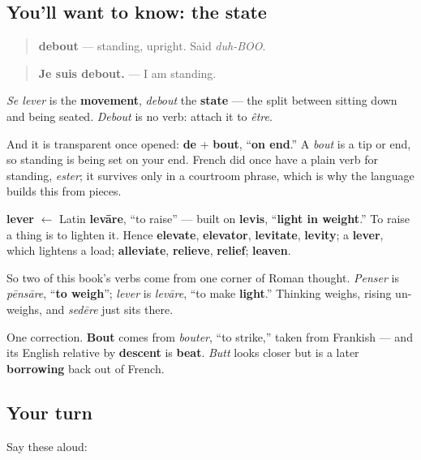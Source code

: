 \subsection*{You'll want to know: the state}
\begin{quote}
\textbf{debout} — standing, upright. Said \emph{duh-BOO}.
\end{quote}

\begin{quote}
\textbf{Je suis debout.} — I am standing.
\end{quote}

\emph{Se lever} is the \textbf{movement}, \emph{debout} the \textbf{state} — the split between sitting down and being seated. \emph{Debout} is no verb: attach it to \emph{être}.

And it is transparent once opened: \textbf{de} + \textbf{bout}, \textquotedblleft{}\textbf{on end}.\textquotedblright{} A \emph{bout} is a tip or end, so standing is being set on your end. French did once have a plain verb for standing, \emph{ester}; it survives only in a courtroom phrase, which is why the language builds this from pieces.

\begin{cousinweb}
\textbf{lever} $\leftarrow$ Latin \textbf{levāre}, \textquotedblleft{}to raise\textquotedblright{} — built on \textbf{levis}, \textquotedblleft{}\textbf{light in weight}.\textquotedblright{} To raise a thing is to lighten it. Hence \textbf{elevate}, \textbf{elevator}, \textbf{levitate}, \textbf{levity}; a \textbf{lever}, which lightens a load; \textbf{alleviate}, \textbf{relieve}, \textbf{relief}; \textbf{leaven}.

So two of this book's verbs come from one corner of Roman thought. \emph{Penser} is \emph{pēnsāre}, \textquotedblleft{}\textbf{to weigh}\textquotedblright{}; \emph{lever} is \emph{levāre}, \textquotedblleft{}to make \textbf{light}.\textquotedblright{} Thinking weighs, rising un-weighs, and \emph{sedēre} just sits there.

One correction. \textbf{Bout} comes from \emph{bouter}, \textquotedblleft{}to strike,\textquotedblright{} taken from Frankish — and its English relative by \textbf{descent} is \textbf{beat}. \emph{Butt} looks closer but is a later \textbf{borrowing} back out of French.
\end{cousinweb}

\subsection*{Your turn}
Say these aloud:

